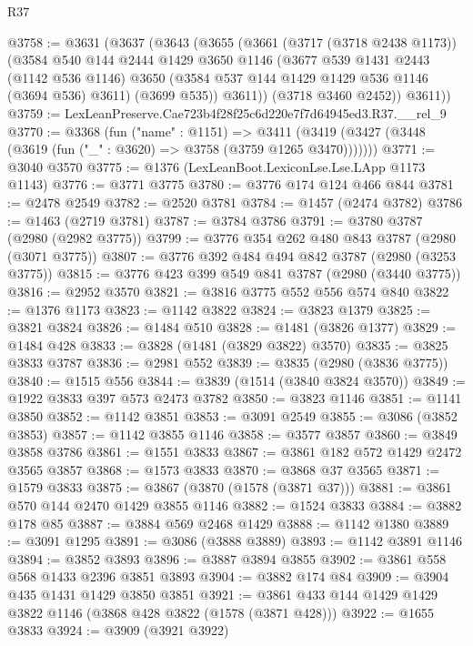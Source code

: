 \begin{lexlean}{R37}
\begin{coremodule}
@3758 := @3631
    (@3637
      (@3643
        (@3655
          (@3661
            (@3717 (@3718 @2438 @1173))
            (@3584
              @540
              @144
              @2444
              @1429
              @3650
              @1146
              (@3677
                @539
                @1431
                @2443
                (@1142 @536 @1146)
                @3650
                (@3584 @537 @144 @1429 @1429 @536 @1146 (@3694 @536) @3611)
                (@3699 @535))
              @3611))
          (@3718 @3460 @2452))
        @3611))
@3759 := LexLeanPreserve.Cae723b4f28f25c6d220e7f7d64945ed3.R37.__rel_9
@3770 := @3368
    (fun ("name" : @1151) =>
    @3411 (@3419 (@3427 (@3448 (@3619 (fun ("_" : @3620) => @3758 (@3759 @1265 @3470)))))))
@3771 := @3040 @3570
@3775 := @1376 (LexLeanBoot.LexiconLse.Lse.LApp @1173 @1143)
@3776 := @3771 @3775
@3780 := @3776 @174 @124 @466 @844
@3781 := @2478 @2549
@3782 := @2520 @3781
@3784 := @1457 (@2474 @3782)
@3786 := @1463 (@2719 @3781)
@3787 := @3784 @3786
@3791 := @3780 @3787 (@2980 (@2982 @3775))
@3799 := @3776 @354 @262 @480 @843 @3787 (@2980 (@3071 @3775))
@3807 := @3776 @392 @484 @494 @842 @3787 (@2980 (@3253 @3775))
@3815 := @3776 @423 @399 @549 @841 @3787 (@2980 (@3440 @3775))
@3816 := @2952 @3570
@3821 := @3816 @3775 @552 @556 @574 @840
@3822 := @1376 @1173
@3823 := @1142 @3822
@3824 := @3823 @1379
@3825 := @3821 @3824
@3826 := @1484 @510
@3828 := @1481 (@3826 @1377)
@3829 := @1484 @428
@3833 := @3828 (@1481 (@3829 @3822) @3570)
@3835 := @3825 @3833 @3787
@3836 := @2981 @552
@3839 := @3835 (@2980 (@3836 @3775))
@3840 := @1515 @556
@3844 := @3839 (@1514 (@3840 @3824 @3570))
@3849 := @1922 @3833 @397 @573 @2473 @3782
@3850 := @3823 @1146
@3851 := @1141 @3850
@3852 := @1142 @3851
@3853 := @3091 @2549
@3855 := @3086 (@3852 @3853)
@3857 := @1142 @3855 @1146
@3858 := @3577 @3857
@3860 := @3849 @3858 @3786
@3861 := @1551 @3833
@3867 := @3861 @182 @572 @1429 @2472 @3565 @3857
@3868 := @1573 @3833
@3870 := @3868 @37 @3565
@3871 := @1579 @3833
@3875 := @3867 (@3870 (@1578 (@3871 @37)))
@3881 := @3861 @570 @144 @2470 @1429 @3855 @1146
@3882 := @1524 @3833
@3884 := @3882 @178 @85
@3887 := @3884 @569 @2468 @1429
@3888 := @1142 @1380
@3889 := @3091 @1295
@3891 := @3086 (@3888 @3889)
@3893 := @1142 @3891 @1146
@3894 := @3852 @3893
@3896 := @3887 @3894 @3855
@3902 := @3861 @558 @568 @1433 @2396 @3851 @3893
@3904 := @3882 @174 @84
@3909 := @3904 @435 @1431 @1429 @3850 @3851
@3921 := @3861 @433 @144 @1429 @1429 @3822 @1146 (@3868 @428 @3822 (@1578 (@3871 @428)))
@3922 := @1655 @3833
@3924 := @3909 (@3921 @3922)

\end{coremodule}
\end{lexlean}
